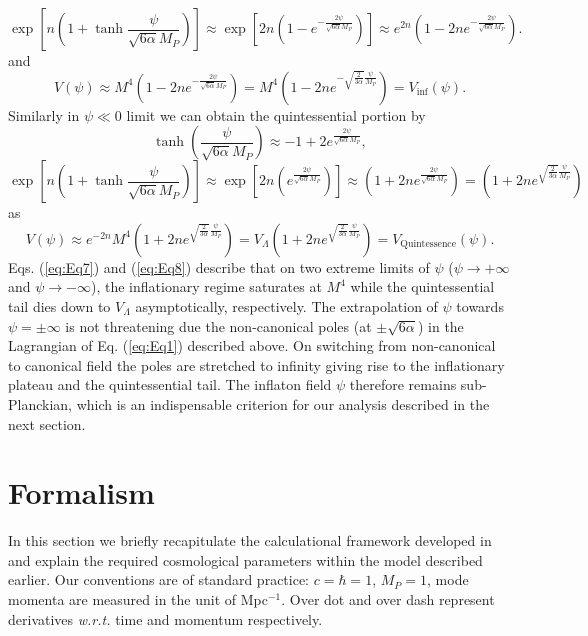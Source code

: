 \documentclass[a4paper,11pt]{article}
\begin{document}
\begin{equation}
    \exp\left[n\left(1+\tanh{\frac{\psi}{\sqrt{6\alpha}M_P}}\right)\right]\approx \exp\left[2n\left(1-e^{-\frac{2\psi}{\sqrt{6\alpha}M_P}}\right)\right]\approx e^{2n}\left(1-2ne^{-\frac{2\psi}{\sqrt{6\alpha}M_P}}\right).
\end{equation} and 
\begin{equation}
    V(\psi)\approx M^4\left(1-2ne^{-\frac{2\psi}{\sqrt{6\alpha}M_P}}\right)=M^4\left(1-2ne^{-\sqrt{\frac{2}{3\alpha}}\frac{\psi}{M_P}}\right)=V_{\mathrm{inf}}(\psi).
    \label{eq:Eq7}
\end{equation}
Similarly in $\psi\ll 0$ limit we can obtain the quintessential portion by 
\begin{equation}
    \tanh{\left(\frac{\psi}{\sqrt{6\alpha}M_P}\right)}\approx -1+2e^{\frac{2\psi}{\sqrt{6\alpha}M_P}},
\end{equation}
\begin{equation}
    \exp\left[n\left(1+\tanh{\frac{\psi}{\sqrt{6\alpha}M_P}}\right)\right]\approx \exp\left[2n\left(e^{\frac{2\psi}{\sqrt{6\alpha}M_P}}\right)\right]\approx \left(1+2ne^{\frac{2\psi}{\sqrt{6\alpha}M_P}}\right)=\left(1+2n e^{\sqrt{\frac{2}{3\alpha}}\frac{\psi}{M_P}}\right)
\end{equation}
as
\begin{equation}
    V(\psi)\approx e^{-2n}M^4\left(1+2n e^{\sqrt{\frac{2}{3\alpha}}\frac{\psi}{M_P}}\right)=V_{\Lambda}\left(1+2n e^{\sqrt{\frac{2}{3\alpha}}\frac{\psi}{M_P}}\right) =V_{\mathrm{Quintessence}}(\psi).
    \label{eq:Eq8}
\end{equation}
Eqs. (\ref{eq:Eq7}) and (\ref{eq:Eq8}) describe that on two extreme limits of $\psi$ ($\psi\rightarrow +\infty$ and $\psi\rightarrow -\infty$), the inflationary regime saturates at $M^4$ while the quintessential tail dies down to $V_{\Lambda}$ asymptotically, respectively.
 The extrapolation of $\psi$ towards $\psi=\pm\infty$ is not threatening due the non-canonical poles (at $\pm\sqrt{6\alpha}$) in the Lagrangian of Eq. (\ref{eq:Eq1}) described above. On switching from non-canonical to canonical field the poles are stretched to infinity giving rise to the inflationary plateau and the quintessential tail. The inflaton field $\psi$ therefore remains sub-Planckian, which is an indispensable criterion for our analysis described in the next section. 
\section{Formalism}
\label{sec:formalism}
In this section we briefly recapitulate the calculational framework developed in \cite{Sarkar:2021ird} and explain the required cosmological parameters within the model described earlier. Our conventions are of standard practice: $c=\hbar=1$, $M_P=1$, mode momenta are measured in the unit of Mpc$^{-1}$. Over dot and over dash represent derivatives \textit{w.r.t.} time and momentum respectively.
\end{document}
